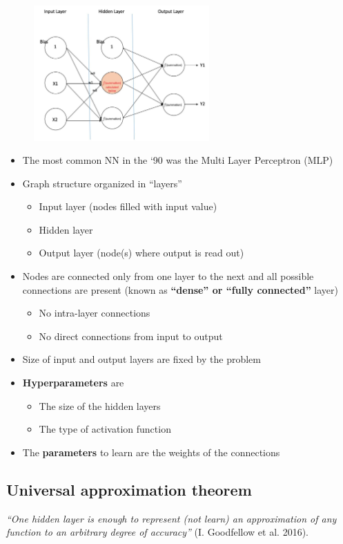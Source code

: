 \begin{figure}
	\includegraphics[width=0.6\textwidth]{figure_ml/mlp.png}
\end{figure} 
\quad
\begin{itemize}
	\item The most common NN in the ‘90 was the Multi Layer	Perceptron (MLP)
	\item Graph structure organized in “layers”
	\begin{itemize}
		\item Input layer (nodes filled with input value)
		\item Hidden layer
		\item Output layer (node(s) where output is read out)
	\end{itemize}
	\item Nodes are connected only from one layer to the next and all possible connections are present (known as \textbf{“dense” or “fully connected”} layer)
	\begin{itemize}
		\item No intra-layer connections
		\item No direct connections from input to output
	\end{itemize}
	\item Size of input and output layers are fixed by the problem
	\item \textbf{Hyperparameters} are
	\begin{itemize}
		\item The size of the hidden layers
		\item The type of activation function
	\end{itemize}
	\item The \textbf{parameters} to learn are the weights of the connections
\end{itemize}

\subsection{Universal approximation theorem}
\textit{“One hidden layer is enough to represent (not learn) an approximation of any function to an arbitrary degree of accuracy”} (I. Goodfellow et al. 2016).\\

